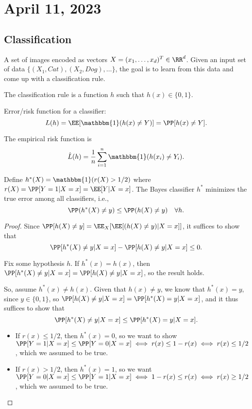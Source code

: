 \section{April 11, 2023}

\subsection{Classification}

A set of images encoded as vectors $X = (x_1, \hdots, x_d)^T\in \RR^d$. Given an input set of data $\{(X_1, Cat), (X_2, Dog), \hdots\}$, the goal is to learn from this data and come up with a classification rule. 

\begin{definition}

The classification rule is a function $h$ such that $h(x)\in \{0,1\}$. 
\end{definition}

Error/risk function for a classifier: 
\[L(h) = \EE[\mathbbm{1}(h(x)\neq Y)] = \PP[h(x)\neq Y].\]

The empirical risk function is 
\[\hat{L}(h) = \frac{1}{n}\sum_{i=1}^n\mathbbm{1}(h(x_i)\neq Y_i).\]

\begin{theorem}
\thmlabel

Define $h^*(X) = \mathbbm{1}(r(X) > 1/2)$ where $r(X) = \PP[Y=1 | X=x] = \EE[Y | X=x]$. The Bayes classifier $h^*$ minimizes the true error among all classifiers, i.e., 
\[\PP(h^*(X)\neq y)\leq \PP(h(X)\neq y)\quad \forall h.\]
\end{theorem}

\begin{proof}
Since $\PP[h(X)\neq y] = \EE_X[\EE[(h(X)\neq y)|X=x]]$, it suffices to show that 
\[\PP[h^*(X)\neq y | X=x] - \PP[h(X)\neq y | X=x]\leq 0.\]

Fix some hypothesis $h$. If $h^*(x) = h(x)$, then $\PP[h^*(X)\neq y|X=x]=\PP[h(X)\neq y|X=x]$, so the result holds. 

So, assume $h^*(x)\neq h(x)$. Given that $h(x)\neq y$, we know that $h^*(x)=y$, since $y\in \{0,1\}$, so $\PP[h(X)\neq y | X=x] = \PP[h^*(X)=y|X=x]$, and it thus suffices to show that 
\[\PP[h^*(X)\neq y | X=x]\leq \PP[h^*(X)=y | X=x].\]
\begin{itemize}
    \item If $r(x)\leq 1/2$, then $h^*(x)=0$, so we want to show $\PP[Y=1|X=x]\leq \PP[Y=0|X=x]\iff r(x)\leq 1-r(x)\iff r(x)\leq 1/2$, which we assumed to be true. 
    \item If $r(x) > 1/2$, then $h^*(x)=1$, so we want $\PP[Y=0|X=x]\leq \PP[Y=1|X=x]\iff 1-r(x)\leq r(x)\iff r(x)\geq 1/2$, which we assumed to be true. 
\end{itemize}
\end{proof}

